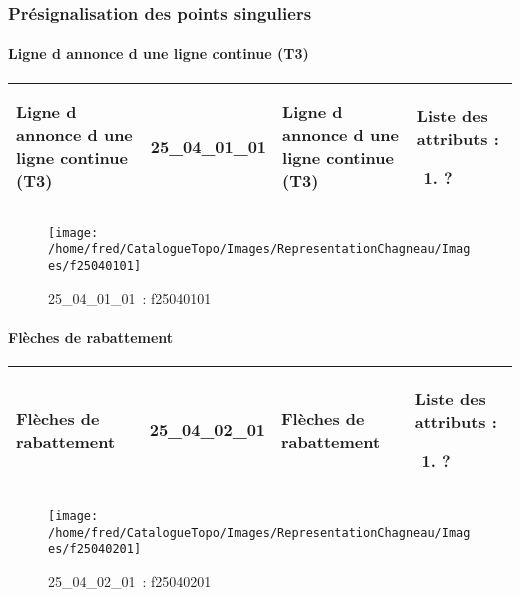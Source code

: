 \documentclass[12pt,titlepage]{book}
\begin{document}
\subsubsection{\large Présignalisation des points singuliers}
\paragraph{Ligne d annonce d une ligne continue (T3)}
\noindent
\vspace{\baselineskip}

\renewcommand{\arraystretch}{1.2}
\begin{supertabular}{|p{10cm}|c|p{13cm}|p{12cm}|}
 Ligne d annonce d une ligne continue (T3) & 25\_04\_01\_01 & Ligne d annonce d une ligne continue (T3) & Liste des attributs :
\begin{enumerate}
  \item ?\end{enumerate}
\\
\hline
\end{supertabular}
\begin{figure}[h!]
  \hfill         %
  \begin{minipage}[t]{3cm}
    \begin{center}
      \texttt{[image: /home/fred/CatalogueTopo/Images/RepresentationChagneau/Images/f25040101]}
      \caption[~25\_04\_01\_01]{\small{25\_04\_01\_01~:} \tiny{f25040101}}\label{f25040101}
    \end{center}
  \end{minipage}
\end{figure}


\paragraph{Flèches de rabattement}
\noindent
\vspace{\baselineskip}

\renewcommand{\arraystretch}{1.2}
\begin{supertabular}{|p{10cm}|c|p{13cm}|p{12cm}|}
 Flèches de rabattement & 25\_04\_02\_01 & Flèches de rabattement & Liste des attributs :
\begin{enumerate}
  \item ?\end{enumerate}
\\
\hline
\end{supertabular}
\begin{figure}[h!]
  \hfill         %
  \begin{minipage}[t]{3cm}
    \begin{center}
      \texttt{[image: /home/fred/CatalogueTopo/Images/RepresentationChagneau/Images/f25040201]}
      \caption[~25\_04\_02\_01]{\small{25\_04\_02\_01~:} \tiny{f25040201}}\label{f25040201}
    \end{center}
  \end{minipage}
\end{figure}
\end{document}
